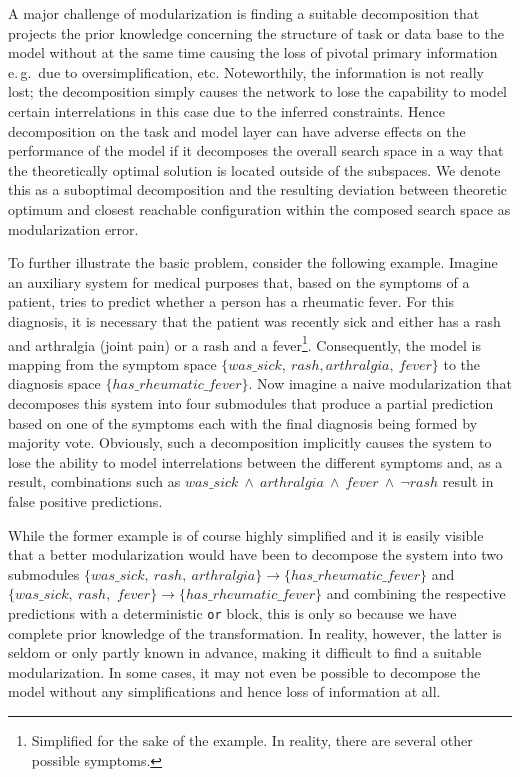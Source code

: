 A major challenge of modularization is finding a suitable decomposition that projects the prior knowledge concerning the structure of task or data base to the model without at the same time causing the loss of pivotal primary information e.\,g.\ due to oversimplification, etc. Noteworthily, the information is not really lost; the decomposition simply causes the network to lose the capability to model certain interrelations in this case due to the inferred constraints. Hence decomposition on the task and model layer can have adverse effects on the performance of the model if it decomposes the overall search space in a way that the theoretically optimal solution is located outside of the subspaces. We denote this as a suboptimal decomposition and the resulting deviation between theoretic optimum and closest reachable configuration within the composed search space as modularization error.

To further illustrate the basic problem, consider the following example. Imagine an auxiliary system for medical purposes that, based on the symptoms of a patient, tries to predict whether a person has a rheumatic fever. For this diagnosis, it is necessary that the patient was recently sick and either has a rash and arthralgia (joint pain) or a rash and a fever\footnote{Simplified for the sake of the example. In reality, there are several other possible symptoms.}. Consequently, the model is mapping from the symptom space $\{was\_sick,\ rash, arthralgia,\ fever\}$ to the diagnosis space $\{has\_rheumatic\_fever\}$. Now imagine a naive modularization that decomposes this system into four submodules that produce a partial prediction based on one of the symptoms each with the final diagnosis being formed by majority vote. Obviously, such a decomposition implicitly causes the system to lose the ability to model interrelations between the different symptoms and, as a result, combinations such as $was\_sick\ \wedge\ arthralgia\ \wedge\ fever\ \wedge\ \neg rash$ result in false positive predictions.

While the former example is of course highly simplified and it is easily visible that a better modularization would have been to decompose the system into two submodules $\{was\_sick,\ rash,\ arthralgia\}\rightarrow\{has\_rheumatic\_fever\}$ and $\{was\_sick,\ rash,$ $fever\}\rightarrow\{has\_rheumatic\_fever\}$ and combining the respective predictions with a deterministic \lstinline{or} block, this is only so because we have complete prior knowledge of the transformation. In reality, however, the latter is seldom or only partly known in advance, making it difficult to find a suitable modularization. In some cases, it may not even be possible to decompose the model without any simplifications and hence loss of information at all.

